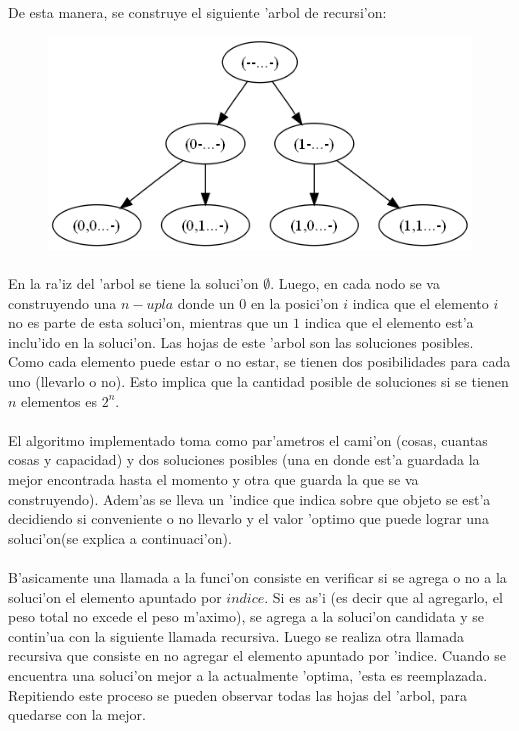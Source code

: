 De esta manera, se construye el siguiente 'arbol de recursi'on:\\
\begin{figure}[H]
\centering
\includegraphics[scale=0.5]{./ejercicio2/arbol.png}
\end{figure}

\paragraph{}
En la ra'iz del 'arbol se tiene la soluci'on $\emptyset$. Luego, en cada nodo se va construyendo una $n-upla$ donde un $0$ en la posici'on $i$ 
indica que el elemento $i$ no es parte de esta soluci'on, mientras que  un $1$ indica que el elemento est'a inclu'ido en la soluci'on.
Las hojas de este 'arbol son las soluciones posibles. Como cada elemento puede estar o no estar, se tienen dos posibilidades para cada
uno (llevarlo o no). Esto implica que la cantidad posible de soluciones si se tienen $n$ elementos es $2^n$.
\paragraph{}
El algoritmo implementado toma como par'ametros el cami'on (cosas, cuantas cosas y capacidad)  y dos soluciones posibles (una en donde est'a guardada la mejor 
encontrada hasta el momento y otra que guarda la que se va construyendo). Adem'as se lleva un 'indice que 
indica sobre que objeto se est'a decidiendo si conveniente o no llevarlo y el valor 'optimo que puede lograr una soluci'on(se explica a continuaci'on).
\paragraph{}
B'asicamente una llamada a la funci'on consiste en verificar si se agrega o no a la soluci'on el elemento apuntado por $indice$. Si es as'i (es 
decir que al agregarlo, el peso total no excede el peso m'aximo), se agrega a la soluci'on candidata y se contin'ua con la 
siguiente llamada recursiva. Luego se realiza otra llamada recursiva que consiste en no agregar el elemento apuntado por 'indice. Cuando se encuentra 
una soluci'on mejor a la actualmente 'optima, 'esta es reemplazada. Repitiendo este proceso se pueden observar todas 
las hojas del 'arbol, para quedarse con la mejor.
